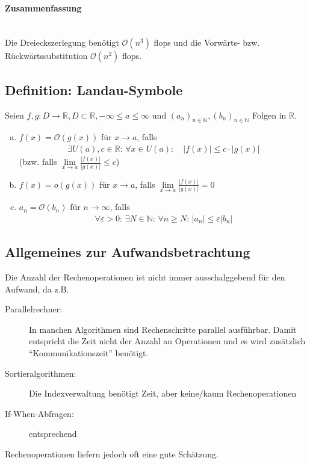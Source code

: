 \documentclass[ngerman,fontsize=11pt, paper=a4, parskip=half, titlepage=true, toc=bib]{scrbook}
\newcommand{\R}{\mathds{R}}
\newcommand{\N}{\mathds{N}}
\begin{document}
\paragraph{Zusammenfassung}~ \\
Die Dreieckszerlegung benötigt $\mathcal{O}(n^3)$ flops und 
die Vorwärts- bzw. Rückwärtssubstitution $\mathcal{O}(n^2)$ flops.



\subsection{Definition: Landau-Symbole} 
Seien $f,g : D\longrightarrow \R, D\subset \R, -\infty\leq a\leq \infty$ und
$(a_n)_{n\in\N}, (b_n)_{n\in\N}$ Folgen in $\R$.
\begin{enumerate}[a)]
\item $f(x) = \mathcal{O}(g(x))$ für $x\longrightarrow a$, falls
  \begin{gather*}
    \exists U(a), c\in\R:\, \forall x\in U(a) : \quad |f(x)| \leq c\cdot |g(x)|
  \end{gather*}
  (bzw. falls $\lim\limits_{x\rightarrow a}\frac{|f(x)|}{|g(x)|} \leq c$)
\item $f(x) = o(g(x))$ für $x\longrightarrow a$, falls 
  $\lim\limits_{x\rightarrow a}\frac{|f(x)|}{|g(x)|} = 0$
\item $a_n = \mathcal{O}(b_n)$ für $n\longrightarrow \infty$, falls
  \begin{gather*}
    \forall \varepsilon > 0 : \, \exists N\in\N : \, \forall n \geq N: \, |a_n| \leq \varepsilon |b_n|
  \end{gather*}
\end{enumerate}

\subsection{Allgemeines zur Aufwandsbetrachtung}
Die Anzahl der Rechenoperationen ist nicht immer ausschalggebend für den Aufwand, da
z.B.
\begin{description}
\item[Parallelrechner:] In manchen Algorithmen sind Rechenschritte parallel ausführbar.
  Damit entspricht die Zeit nicht der Anzahl an Operationen und es wird zusätzlich
  \enquote{Kommunikationszeit} benötigt.
\item[Sortieralgorithmen:] Die Indexverwaltung benötigt Zeit, aber keine/kaum Rechenoperationen
\item[If-When-Abfragen:] entsprechend
\end{description}
Rechenoperationen liefern jedoch oft eine gute Schätzung.
\end{document}

